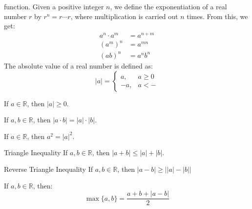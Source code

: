 \documentclass[crop=false,class=book,oneside]{standalone}
\begin{document}
            function. Given a positive integer $n$, we define the
            exponentiation of a real number $r$ by
            $r^{n}=r\cdots{r}$, where multiplication is
            carried out $n$ times. From this, we get:
            \begin{subequations}
                \begin{align}
                    a^{n}\cdot{a}^{m}&=a^{n+m}\\
                    (a^{m})^{n}&=a^{mn}\\
                    (ab)^{n}&=a^{n}b^{n}
                \end{align}
            \end{subequations}
            The absolute value of a real number is defined as:
            \begin{equation}
                |a|=
                \begin{cases}
                    a,&a\geq{0}\\
                    \minus{a},&a<-
                \end{cases}
            \end{equation}
            \begin{theorem}
                If $a\in\mathbb{R}$, then $|a|\geq{0}$.
            \end{theorem}
            \begin{theorem}
                If $a,b\in\mathbb{R}$, then
                $|a\cdot{b}|=|a|\cdot|b|$.
            \end{theorem}
            \begin{theorem}
                If $a\in\mathbb{R}$, then $a^{2}=|a|^{2}$.
            \end{theorem}
            \begin{ltheorem}{Triangle Inequality}
                If $a,b\in\mathbb{R}$, then
                $|a+b|\leq|a|+|b|$.
            \end{ltheorem}
            \begin{ltheorem}{Reverse Triangle Inequality}
                If $a,b\in\mathbb{R}$, then
                $|a-b|\geq\big||a|-|b|\big|$
            \end{ltheorem}
            \begin{theorem}
                If $a,b\in\mathbb{R}$, then:
                \begin{equation}
                    \max\{a,b\}=\frac{a+b+|a-b|}{2}
                \end{equation}
            \end{theorem}
\end{document}
